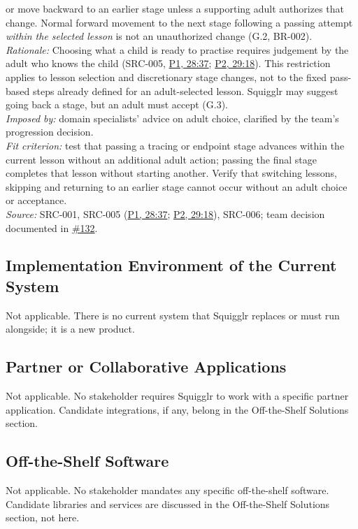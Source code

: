 \documentclass[12pt]{article}
\renewcommand{\_}{\textunderscore\allowbreak}%
\newcommand{\intlink}[3]{\hyperref[int:#1-#2]{#3}}
\newcommand{\intref}[2]{\intlink{#1}{#2}{#1, #2}}
\begin{document}
\begin{description}
or move backward to an earlier stage unless a supporting adult authorizes that
change. Normal forward movement to the next stage following a passing attempt
\emph{within the selected lesson} is not an unauthorized change (G.2, BR-002).\\
\emph{Rationale:} Choosing what a child is ready to practise requires judgement
by the adult who knows the child (SRC-005, \intref{P1}{28:37};
\intref{P2}{29:18}). This restriction applies to lesson selection and
discretionary stage changes, not to the fixed pass-based steps already defined
for an adult-selected lesson. Squigglr may suggest going back a stage, but an
adult must accept (G.3).\\
\emph{Imposed by:} domain specialists' advice on adult choice, clarified by the
team's progression decision.\\
\emph{Fit criterion:} test that passing a tracing or endpoint stage advances
within the current lesson without an additional adult action; passing the final
stage completes that lesson without starting another. Verify that switching
lessons, skipping and returning to an earlier stage cannot occur without an
adult choice or acceptance.\\
\emph{Source:} SRC-001, SRC-005 (\intref{P1}{28:37}; \intref{P2}{29:18}),
SRC-006; team decision documented in
\href{https://github.com/AHMEDELZARIA/squigglr/issues/132}{\#132}.
\end{description}

\subsection{Implementation Environment of the Current System}
Not applicable. There is no current system that Squigglr replaces or must run
alongside; it is a new product.

\subsection{Partner or Collaborative Applications}
Not applicable. No stakeholder requires Squigglr to work with a specific partner
application. Candidate integrations, if any, belong in the Off-the-Shelf
Solutions section.

\subsection{Off-the-Shelf Software}
Not applicable. No stakeholder mandates any specific off-the-shelf software.
Candidate libraries and services are discussed in the Off-the-Shelf Solutions
section, not here.
\end{document}
